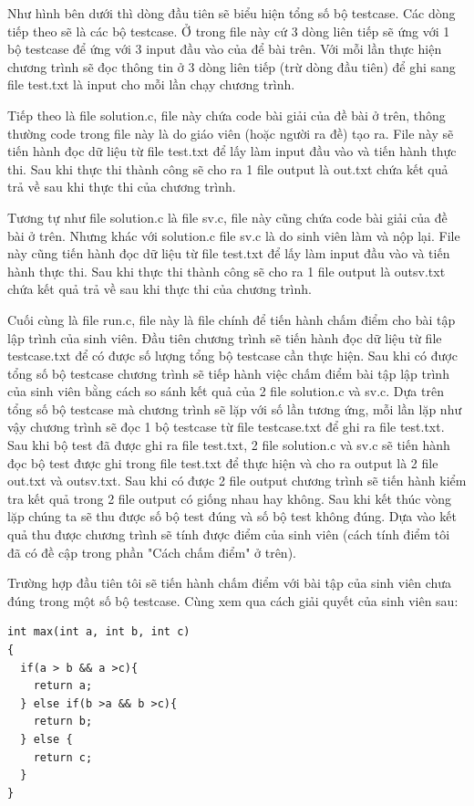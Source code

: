 \documentclass[12pt,a4paper]{article}
\begin{document}
Như hình bên dưới thì dòng đầu tiên sẽ biểu hiện tổng số bộ testcase. Các dòng tiếp theo sẽ là các bộ testcase. Ở trong file này cứ 3 dòng liên tiếp sẽ ứng với 1 bộ testcase để ứng với 3 input đầu vào của để bài trên. Với mỗi lần thực hiện chương trình sẽ đọc thông tin ở 3 dòng liên tiếp (trừ dòng đầu tiên) để ghi sang file test.txt là input cho mỗi lần chạy chương trình.

Tiếp theo là file solution.c, file này chứa code bài giải của đề bài ở trên, thông thường code trong file này là do giáo viên (hoặc người ra đề) tạo ra. File này sẽ tiến hành đọc dữ liệu từ file test.txt để lấy làm input đầu vào và tiến hành thực thi. Sau khi thực thi thành công sẽ cho ra 1 file output là out.txt chứa kết quả trả về sau khi thực thi của chương trình.

Tương tự như file solution.c là file sv.c, file này cũng chứa code bài giải của đề bài ở trên. Nhưng khác với solution.c file sv.c là do sinh viên làm và nộp lại. File này cũng tiến hành đọc dữ liệu từ file test.txt để lấy làm input đầu vào và tiến hành thực thi. Sau khi thực thi thành công sẽ cho ra 1 file output là outsv.txt chứa kết quả trả về sau khi thực thi của chương trình.

Cuối cùng là file run.c, file này là file chính để tiến hành chấm điểm cho bài tập lập trình của sinh viên. Đầu tiên chương trình sẽ tiến hành đọc dữ liệu từ file testcase.txt để có được số lượng tổng bộ testcase cần thực hiện. Sau khi có được tổng số bộ testcase chương trình sẽ tiếp hành việc chấm điểm bài tập lập trình của sinh viên bằng cách so sánh kết quả của 2 file solution.c và sv.c. Dựa trên tổng số bộ testcase mà chương trình sẽ lặp với số lần tương ứng, mỗi lần lặp như vậy chương trình sẽ đọc 1 bộ testcase từ file testcase.txt để ghi ra file test.txt. Sau khi bộ test đã được ghi ra file test.txt, 2 file solution.c và sv.c sẽ tiến hành đọc bộ test được ghi trong file test.txt để thực hiện và cho ra output là 2 file out.txt và outsv.txt. Sau khi có được 2 file output chương trình sẽ tiến hành kiểm tra kết quả trong 2 file output có giống nhau hay không. Sau khi kết thúc vòng lặp chúng ta sẽ thu được số bộ test đúng và số bộ test không đúng. Dựa vào kết quả thu được chương trình sẽ tính được điểm của sinh viên (cách tính điểm tôi đã có đề cập trong phần "Cách chấm điểm" ở trên).

Trường hợp đầu tiên tôi sẽ tiến hành chấm điểm với bài tập của sinh viên chưa đúng trong một số bộ testcase. Cùng xem qua cách giải quyết của sinh viên sau:

\begin{lstlisting}
int max(int a, int b, int c)
{
  if(a > b && a >c){   
    return a;
  } else if(b >a && b >c){
    return b;
  } else {
    return c;
  }
}
\end{lstlisting}
\end{document}
